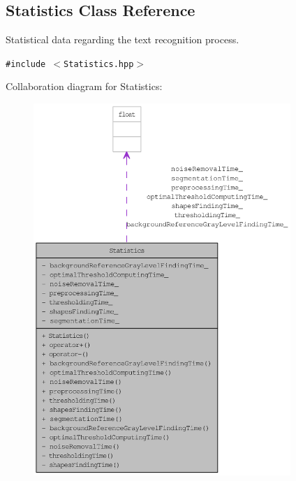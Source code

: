 \hypertarget{class_statistics}{
\subsection{Statistics Class Reference}
\label{class_statistics}
}
Statistical data regarding the text recognition process.  


{\tt \#include $<$Statistics.hpp$>$}

Collaboration diagram for Statistics:\nopagebreak
\begin{figure}[H]
\begin{center}
\leavevmode
\includegraphics[height=400pt]{class_statistics__coll__graph}
\end{center}
\end{figure}
